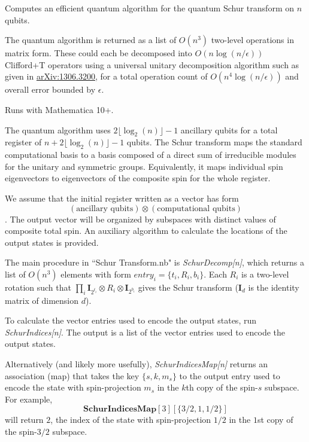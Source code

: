 \documentclass[12pt]{article}
\begin{document}
Computes an efficient quantum algorithm for the quantum Schur transform on $n$ qubits.

The quantum algorithm is returned as a list of $O(n^3)$ two-level operations in matrix form.
These could each be decomposed into $O(n\log(n/\epsilon))$ Clifford+T operators using a universal unitary decomposition algorithm such as given in \href{arXiv:1306.3200}{arXiv:1306.3200}, for a total operation count of $O(n^4\log(n/\epsilon))$ and overall error bounded by $\epsilon$.

Runs with Mathematica 10+.

The quantum algorithm uses $2\lfloor\log_2(n)\rfloor-1$ ancillary qubits for a total register of $n+2\lfloor\log_2(n)\rfloor-1$ qubits.
The Schur transform maps the standard computational basis to a basis composed of a direct sum of irreducible modules for the unitary and symmetric groups.
Equivalently, it maps individual spin eigenvectors to eigenvectors of the composite spin for the whole register.

We assume that the initial register written as a vector has form $$(\text{ancillary qubits})\otimes(\text{computational qubits})$$.
The output vector will be organized by subspaces with distinct values of composite total spin.
An auxiliary algorithm to calculate the locations of the output states is provided.

The main procedure in ``Schur Transform.nb" is \emph{SchurDecomp[n]}, which returns a list of $O(n^3)$ elements with form $entry_i=\{t_i,R_i,b_i\}$.
Each $R_i$ is a two-level rotation such that $\prod_i\textbf{I}_{2^{t_i}}\otimes R_i\otimes\textbf{I}_{2^{b_i}}$ gives the Schur transform ($\textbf{I}_d$ is the identity matrix of dimension $d$).

To calculate the vector entries used to encode the output states, run \emph{SchurIndices[n]}.
The output is a list of the vector entries used to encode the output states.

Alternatively (and likely more usefully), \emph{SchurIndicesMap[n]} returns an association (map) that takes the key $\{s,k,m_s\}$ to the output entry used to encode the state with spin-projection $m_s$ in the $k$th copy of the spin-$s$ subspace.
For example, $$\textbf{SchurIndicesMap}[3][\{3/2,1,1/2\}]$$ will return $2$, the index of the state with spin-projection $1/2$ in the $1$st copy of the spin-$3/2$ subspace.
\end{document}
